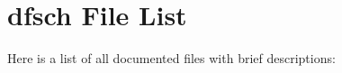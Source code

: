 \section{dfsch File List}
Here is a list of all documented files with brief descriptions:\begin{CompactList}
\item{}
\item{}
\item{}
\end{CompactList}
